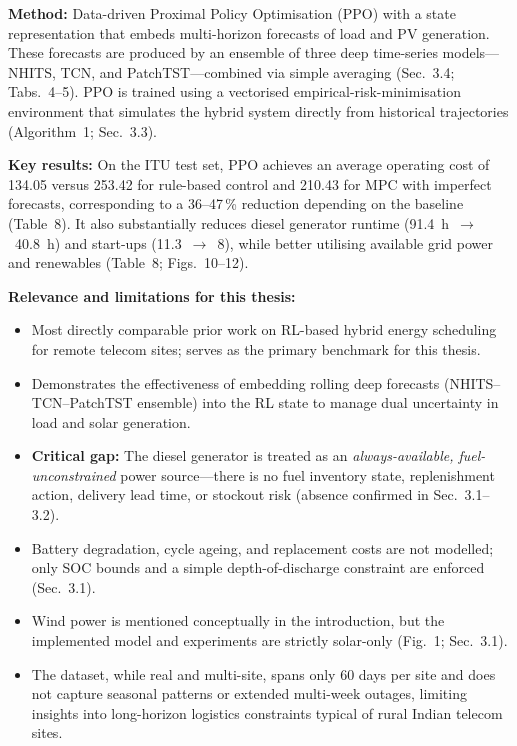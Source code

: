 \textbf{Method:} Data-driven Proximal Policy Optimisation (PPO) with a state representation that embeds multi-horizon forecasts of load and PV generation. These forecasts are produced by an ensemble of three deep time-series models—NHITS, TCN, and PatchTST—combined via simple averaging (Sec.~3.4; Tabs.~4--5). PPO is trained using a vectorised empirical-risk-minimisation environment that simulates the hybrid system directly from historical trajectories (Algorithm~1; Sec.~3.3).

\textbf{Key results:} On the ITU test set, PPO achieves an average operating cost of 134.05 versus 253.42 for rule-based control and 210.43 for MPC with imperfect forecasts, corresponding to a 36--47\,\% reduction depending on the baseline (Table~8). It also substantially reduces diesel generator runtime (91.4~h~$\rightarrow$~40.8~h) and start-ups (11.3~$\rightarrow$~8), while better utilising available grid power and renewables (Table~8; Figs.~10--12).

\textbf{Relevance and limitations for this thesis:}
\begin{itemize}
    \item Most directly comparable prior work on RL-based hybrid energy scheduling for remote telecom sites; serves as the primary benchmark for this thesis.
    \item Demonstrates the effectiveness of embedding rolling deep forecasts (NHITS--TCN--PatchTST ensemble) into the RL state to manage dual uncertainty in load and solar generation.
    \item \textbf{Critical gap:} The diesel generator is treated as an \emph{always-available, fuel-unconstrained} power source—there is no fuel inventory state, replenishment action, delivery lead time, or stockout risk (absence confirmed in Sec.~3.1--3.2).
    \item Battery degradation, cycle ageing, and replacement costs are not modelled; only SOC bounds and a simple depth-of-discharge constraint are enforced (Sec.~3.1).
    \item Wind power is mentioned conceptually in the introduction, but the implemented model and experiments are strictly solar-only (Fig.~1; Sec.~3.1).
    \item The dataset, while real and multi-site, spans only 60 days per site and does not capture seasonal patterns or extended multi-week outages, limiting insights into long-horizon logistics constraints typical of rural Indian telecom sites.
\end{itemize}

